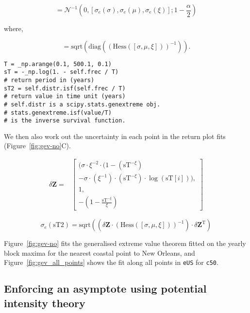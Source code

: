 \begin{equation}
[\Delta \sigma , \Delta \mu, \Delta \xi] =
\mathcal{N}^{-1}(0, [\sigma_e (\sigma), \sigma_e (\mu), \sigma_e (\xi)]; 1-\frac{\alpha}{2})
\end{equation}

where,

\begin{equation}
[\sigma_e (\sigma), \sigma_e (\mu), \sigma_e (\xi)] =
\mathrm{sqrt}\left(\mathrm{diag}\left(\left( \mathrm{Hess}([\sigma, \mu, \xi]) \right)^{-1} \right)\right).
\end{equation}

\begin{verbatim}
T = _np.arange(0.1, 500.1, 0.1)
sT = -_np.log(1. - self.frec / T)
# return period in (years)
sT2 = self.distr.isf(self.frec / T)
# return value in time unit (years)
# self.distr is a scipy.stats.genextreme obj.
# stats.genextreme.isf(value/T)
# is the inverse survival function.
\end{verbatim}

We then also work out the uncertainty in each point in the
return plot fits (Figure~\ref{fig:gev-no}C).

\begin{align}
\delta \mathbf{Z} = & \left[ \begin{array}{l}(\sigma\cdot\xi^{-2} \cdot (1-(\mathrm{sT}^{-\xi})
            \\-\sigma \cdot (\xi^{-1})\cdot (\mathrm{sT}^{-\xi}) \cdot \log(\mathrm{sT}[i])),\\
            1,\\
            -(1- \frac{\mathrm{sT}^{-\xi}}{\xi})
            \end{array} \right]
\end{align}

\begin{equation}
\sigma_e(\mathrm{sT2}) = \mathrm{sqrt}\left(\left(\delta \mathbf{Z} \cdot \left( \mathrm{Hess}\left([\sigma, \mu, \xi]\right) \right)^{-1} \right) \cdot  \delta \mathbf{Z}^{\mathrm{T}}\right)
\end{equation}

Figure~\ref{fig:gev-no} fits the generalised extreme value theorem fitted
on the yearly block maxima for the nearest coastal point to New Orleans,
and Figure~\ref{fig:gev_all_points} shows the fit along all points in \texttt{eUS}
for \texttt{c50}.

\subsection{Enforcing an asymptote using potential intensity theory }
\label{sec:evt-limit}

